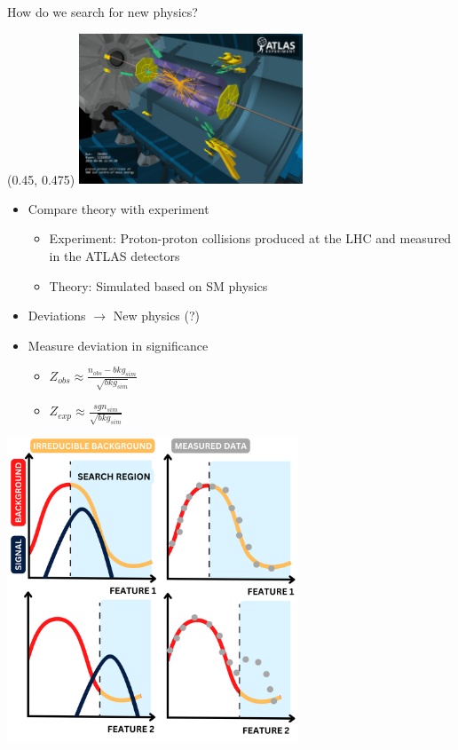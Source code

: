 \documentclass[UKenglish]{beamer}
\begin{document}
\begin{frame}{How do we search for new physics?}
    \begin{textblock}{1}(0.45, 0.475)
        \includegraphics[width=0.5\textwidth]{figures/vp1_3dcocktail_run264034_evt11526514_2015-05-06T22-54-50_2}
    \end{textblock}
    \begin{itemize}
        \item Compare theory with experiment 
        \begin{itemize}
            \item Experiment: Proton-proton collisions produced at the LHC and measured in the ATLAS detectors
            \item Theory: Simulated based on SM physics 
        \end{itemize}
        \item Deviations $\rightarrow$ New physics (?) 
        \item Measure deviation in significance
        \begin{itemize}
            \item $Z_{obs}\approx \frac{n_{obs} - bkg_{sim}}{\sqrt{bkg_{sim}}}$
            \item $Z_{exp}\approx \frac{sgn_{sim}}{\sqrt{bkg_{sim}}}$
        \end{itemize}
    \end{itemize}

\end{frame}
\begin{frame}
    \vfill
    \centering
    \includegraphics[width = 0.65\textwidth]{figures/DataComp.png}
\end{frame}
\end{document}
